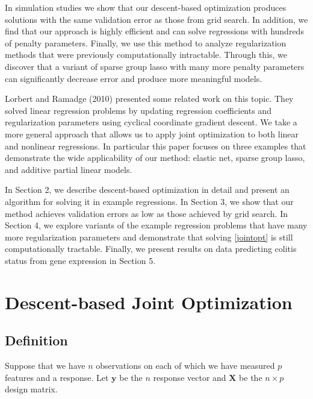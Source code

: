 \documentclass[10pt,letterpaper]{article}
\begin{document}
In simulation studies we show that our descent-based optimization produces solutions with the same validation error as those from grid search. In addition, we find that our approach is highly efficient and can solve regressions with hundreds of penalty parameters. Finally, we use this method to analyze regularization methods that were previously computationally intractable. Through this, we discover that a variant of sparse group lasso with many more penalty parameters can significantly decrease error and produce more meaningful models.

Lorbert and Ramadge (2010) presented some related work on this topic. They solved linear regression problems by updating regression coefficients and regularization parameters using cyclical coordinate gradient descent. We take a more general approach that allows us to apply joint optimization to both linear and nonlinear regressions. In particular this paper focuses on three examples that demonstrate the wide applicability of our method: elastic net, sparse group lasso, and additive partial linear models.

In Section 2, we describe descent-based optimization in detail and present an algorithm for solving it in example regressions. In Section 3, we show that our method achieves validation errors as low as those achieved by grid search. In Section 4, we explore variants of the example regression problems that have many more regularization parameters and demonstrate that solving \eqref{jointopt} is still computationally tractable. Finally, we present results on data predicting colitis status from gene expression in Section 5.

\section{Descent-based Joint Optimization}
\subsection{Definition}
Suppose that we have $n$ observations on each of which we have measured $p$ features and a response. Let $\boldsymbol{y}$ be the $n$ response vector and $\boldsymbol{X}$ be the $n \times p$ design matrix.
\end{document}
